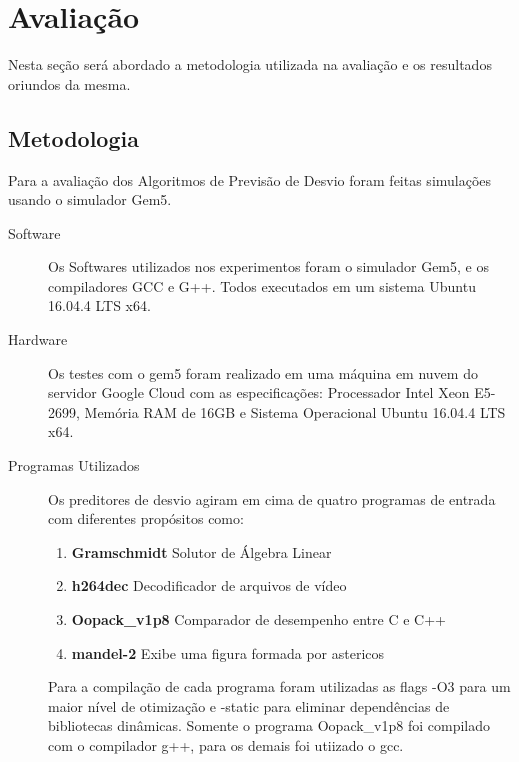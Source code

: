 \documentclass[12pt]{article}
\begin{document}
\section{Avaliação}

Nesta seção será abordado a metodologia utilizada na avaliação e os resultados oriundos da mesma.

\subsection{Metodologia}

Para a avaliação dos Algoritmos de Previsão de Desvio foram feitas simulações usando o simulador Gem5.

\begin{description}

\item[Software]

Os Softwares utilizados nos experimentos foram o simulador Gem5, e os compiladores GCC e G++. Todos executados em um sistema Ubuntu 16.04.4 LTS x64.

\item[Hardware]

Os testes com o gem5 foram realizado em uma máquina em nuvem do servidor Google Cloud com as especificações: Processador Intel Xeon E5-2699, Memória RAM de 16GB e Sistema Operacional Ubuntu 16.04.4 LTS x64.


\item[Programas Utilizados]

Os preditores de desvio agiram em cima de quatro programas de entrada com diferentes propósitos como:

\begin{enumerate}

    \item \textbf{Gramschmidt} Solutor de Álgebra Linear
    \item \textbf{h264dec} Decodificador de arquivos de vídeo
    \item \textbf{Oopack\_v1p8} Comparador de desempenho entre C e C++
    \item \textbf{mandel-2} Exibe uma figura formada por astericos
    
\end{enumerate}

Para a compilação de cada programa foram utilizadas as flags -O3 para um maior nível de otimização e -static para eliminar dependências de bibliotecas dinâmicas. Somente o programa Oopack\_v1p8 foi compilado com o compilador g++, para os demais foi utiizado o gcc.


\end{description}
\end{document}
